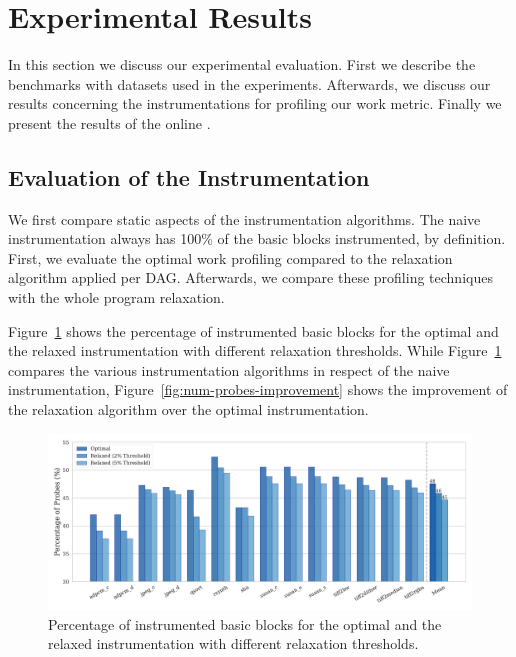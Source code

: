\section{Experimental Results}

In this section we discuss our experimental evaluation.
First we describe the benchmarks with datasets used in the experiments.
Afterwards, we discuss our results concerning the instrumentations for profiling our work metric.
Finally we present the results of the online {\itercomp}.

\subsection{Evaluation of the Instrumentation}

We first compare static aspects of the instrumentation algorithms.
The naive instrumentation always has 100\% of the basic blocks instrumented, by definition.
First, we evaluate the optimal work profiling compared to the relaxation algorithm applied per DAG.
Afterwards, we compare these profiling techniques with the whole program relaxation.

Figure~\ref{fig:num-probes} shows the percentage of instrumented basic blocks for the optimal and the relaxed instrumentation with different relaxation thresholds.
While Figure~\ref{fig:num-probes} compares the various instrumentation algorithms in respect of the naive instrumentation, Figure~\ref{fig:num-probes-improvement} shows the improvement of the relaxation algorithm  over the optimal instrumentation.

\begin{figure}[ht]
    \centering
    \includegraphics[width=\textwidth]{figs/num-probes.pdf}
    \caption{Percentage of instrumented basic blocks for the optimal and the relaxed instrumentation with different relaxation thresholds.}
    \label{fig:num-probes}
\end{figure}

